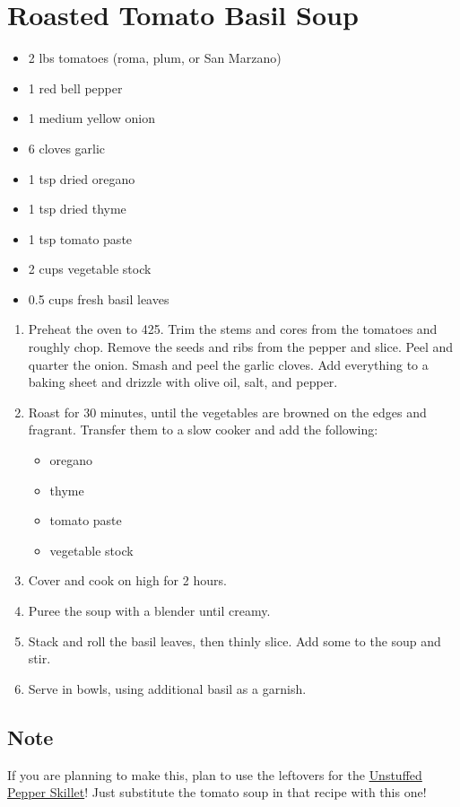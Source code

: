 \section{Roasted Tomato Basil Soup}
\label{loc:tomato_soup}

\begin{itemize}
\item 2 lbs tomatoes (roma, plum, or San Marzano)
\item 1 red bell pepper
\item 1 medium yellow onion
\item 6 cloves garlic
\item 1 tsp dried oregano
\item 1 tsp dried thyme
\item 1 tsp tomato paste
\item 2 cups vegetable stock
\item 0.5 cups fresh basil leaves
\end{itemize}

\begin{enumerate}
\item Preheat the oven to 425. Trim the stems and cores from the tomatoes and roughly chop. Remove the seeds and ribs
    from the pepper and slice. Peel and quarter the onion. Smash and peel the garlic cloves. Add everything to a baking
    sheet and drizzle with olive oil, salt, and pepper.
\item Roast for 30 minutes, until the vegetables are browned on the edges and fragrant. Transfer them to a slow cooker and
    add the following:
\begin{itemize}
    \item oregano
    \item thyme
    \item tomato paste
    \item vegetable stock
\end{itemize}
\item Cover and cook on high for 2 hours.
\item Puree the soup with a blender until creamy.
\item Stack and roll the basil leaves, then thinly slice. Add some to the soup and stir.
\item Serve in bowls, using additional basil as a garnish.
\end{enumerate}

\subsection{Note}

If you are planning to make this, plan to use the leftovers for the \hyperref[loc:unstuffed_pepper]{Unstuffed Pepper Skillet}!
Just substitute the tomato soup in that recipe with this one!
